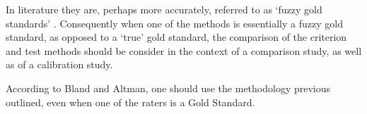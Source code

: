 \documentclass[12pt, a4paper]{report}
\theoremstyle{plain}
\theoremstyle{definition}
\theoremstyle{remark}
\begin{document}
	In literature they are, perhaps more accurately, referred to as
	`fuzzy gold standards' \citep{phelps}. Consequently when one of the methods is
	essentially a fuzzy gold standard, as opposed to a `true' gold
	standard, the comparison of the criterion and test methods should
	be consider in the context of a comparison study, as well as of a
	calibration study.
	
	
	
	
	According to Bland and Altman, one should use the methodology
	previous outlined, even when one of the raters is a Gold Standard.
	
	
	



\end{document}
